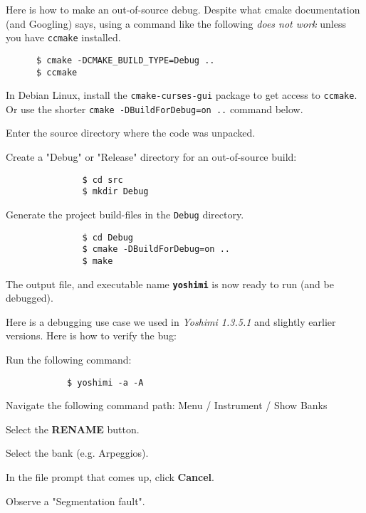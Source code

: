    Here is how to make an out-of-source debug.  Despite what
   cmake documentation (and Googling) says, using a command like the
   following \textsl{does not work} unless you have \texttt{ccmake}
   installed.

   \begin{verbatim}
      $ cmake -DCMAKE_BUILD_TYPE=Debug ..
      $ ccmake
   \end{verbatim}
   
   In Debian Linux, install the \texttt{cmake-curses-gui}
   package to get access to \texttt{ccmake}.  Or use the shorter
   \texttt{cmake -DBuildForDebug=on ..} command below.

   \begin{enumber}
      \item Enter the source directory where the code was unpacked.
      \item Create a "Debug" or "Release" directory for an
            out-of-source build:
            \begin{verbatim}
               $ cd src
               $ mkdir Debug
            \end{verbatim}
      \item Generate the project build-files in the \texttt{Debug}
            directory.
            \begin{verbatim}
               $ cd Debug
               $ cmake -DBuildForDebug=on ..
               $ make
            \end{verbatim}
   \end{enumber}

   The output file, and executable name \textbf{\texttt{yoshimi}}
   is now ready to run (and be debugged).

   Here is a debugging use case we used in \textsl{Yoshimi 1.3.5.1} and
   slightly earlier versions.  Here is how to verify the bug:

   \begin{enumber}
      \item Run the following command:
         \begin{verbatim}
            $ yoshimi -a -A
         \end{verbatim}
      \item Navigate the following command path:
            Menu / Instrument / Show Banks
      \item Select the \textbf{RENAME} button.
      \item Select the bank (e.g. Arpeggios).
      \item In the file prompt that comes up, click \textbf{Cancel}.
      \item Observe a "Segmentation fault".
   \end{enumber}

